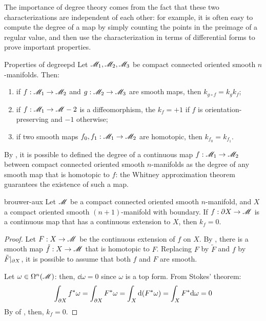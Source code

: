 The importance of degree theory comes from the fact that these two characterizations are independent of each other: for example, it is often easy to compute the degree of a map by simply counting the points in the preimage of a regular value, and then use the characterization in terms of differential forms to prove important properties.

\begin{lemma}{Properties of degree}{pd}
  Let $ \mathscr{M}_1 , \mathscr{M}_2 , \mathscr{M}_3 $ be compact connected oriented smooth $ n $-manifolds. Then:
  \begin{enumerate}
    \item \label{item:pd-1} if $ f : \mathscr{M}_1 \rightarrow \mathscr{M}_2 $ and $ g : \mathscr{M}_2 \rightarrow \mathscr{M}_3 $ are smooth maps, then $ k_{g \circ f} = k_g k_f $;
    \item \label{item:pd-2} if $ f : \mathscr{M}_1 \rightarrow \mathscr{M}-2 $ is a diffeomorphism, the $ k_f = + 1 $ if $ f $ is orientation-preserving and $ -1 $ otherwise;
    \item \label{item:pd-3} if two smooth maps $ f_0 , f_1 : \mathscr{M}_1 \rightarrow \mathscr{M}_2 $ are homotopic, then $ k_{f_0} = k_{f_1} $.
  \end{enumerate}
\end{lemma}

By , it is possible to defined the degree of a continuous map $ f : \mathscr{M}_1 \rightarrow \mathscr{M}_2 $ between compact connected oriented smooth $ n $-manifolds as the degree of any smooth map that is homotopic to $ f $: the Whitney approximation theorem  guarantees the existence of such a map.

\begin{proposition}{}{brouwer-aux}
  Let $ \mathscr{M} $ be a compact connected oriented smooth $ n $-manifold, and $ X $ a compact oriented smooth $ (n+1) $-manifold with boundary. If $ f : \partial X \rightarrow \mathscr{M} $ is a continuous map that has a continuous extension to $ X $, then $ k_f = 0 $.
\end{proposition}

\begin{proofbox}
  \begin{proof}
    Let $ F : X \rightarrow \mathscr{M} $ be the continuous extension of $ f $ on $ X $. By , there is a smooth map $ \tilde{f} : X \rightarrow \mathscr{M} $ that is homotopic to $ F $. Replacing $ F $ by $ \tilde{F} $ and $ f $ by $ \tilde{F} \vert_{\partial X} $, it is possible to assume that both $ f $ and $ F $ are smooth.

    Let $ \omega \in \Omega^{n}(\mathscr{M}) $: then, $ \dd \omega = 0 $ since $ \omega $ is a top form. From Stokes' theorem:
    \begin{equation*}
      \int_{\partial X} f^* \omega = \int_{\partial X} F^* \omega = \int_X \mathrm{d} (F^* \omega) = \int_X F^* \mathrm{d} \omega = 0
    \end{equation*}
    By  of , then, $ k_f = 0 $.
  \end{proof}
\end{proofbox}

